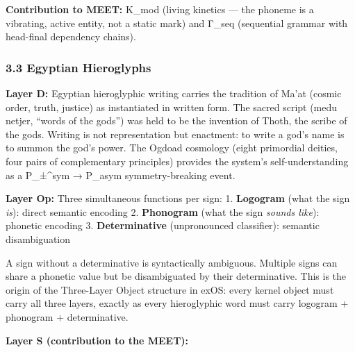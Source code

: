 \documentclass[
  11pt,
  a4paper,
]{article}
\begin{document}
\textbf{Contribution to MEET:} K\_mod (living kinetics --- the phoneme
is a vibrating, active entity, not a static mark) and Γ\_seq (sequential
grammar with head-final dependency chains).

\subsubsection{3.3 Egyptian Hieroglyphs}\label{egyptian-hieroglyphs}

\textbf{Layer D:} Egyptian hieroglyphic writing carries the tradition of
Ma'at (cosmic order, truth, justice) as instantiated in written form.
The sacred script (medu netjer, ``words of the gods'') was held to be
the invention of Thoth, the scribe of the gods. Writing is not
representation but enactment: to write a god's name is to summon the
god's power. The Ogdoad cosmology (eight primordial deities, four pairs
of complementary principles) provides the system's self-understanding as
a P\_±\^{}sym → P\_asym symmetry-breaking event.

\textbf{Layer Op:} Three simultaneous functions per sign: 1.
\textbf{Logogram} (what the sign \emph{is}): direct semantic encoding 2.
\textbf{Phonogram} (what the sign \emph{sounds like}): phonetic encoding
3. \textbf{Determinative} (unpronounced classifier): semantic
disambiguation

A sign without a determinative is syntactically ambiguous. Multiple
signs can share a phonetic value but be disambiguated by their
determinative. This is the origin of the Three-Layer Object structure in
exOS: every kernel object must carry all three layers, exactly as every
hieroglyphic word must carry logogram + phonogram + determinative.

\textbf{Layer S (contribution to the MEET):}
\end{document}
